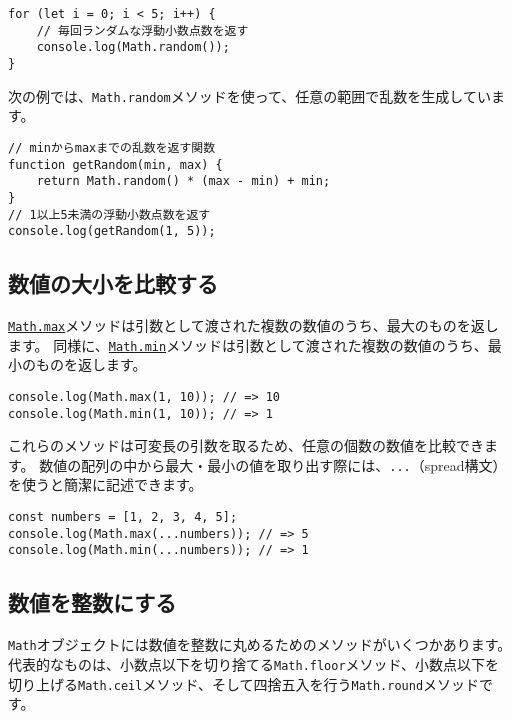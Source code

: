 \begin{lstlisting}
for (let i = 0; i < 5; i++) {
    // 毎回ランダムな浮動小数点数を返す
    console.log(Math.random());
}
\end{lstlisting}

次の例では、\texttt{Math.random}メソッドを使って、任意の範囲で乱数を生成しています。

\begin{lstlisting}
// minからmaxまでの乱数を返す関数
function getRandom(min, max) {
    return Math.random() * (max - min) + min;
}
// 1以上5未満の浮動小数点数を返す
console.log(getRandom(1, 5));
\end{lstlisting}

\hypertarget{compare-number}{%
\subsection{数値の大小を比較する}\label{compare-number}}

\href{https://developer.mozilla.org/ja/docs/Web/JavaScript/Reference/Global_Objects/Math/max}{\texttt{Math.max}}メソッドは引数として渡された複数の数値のうち、最大のものを返します。
同様に、\href{https://developer.mozilla.org/ja/docs/Web/JavaScript/Reference/Global_Objects/Math/min}{\texttt{Math.min}}メソッドは引数として渡された複数の数値のうち、最小のものを返します。

\begin{lstlisting}
console.log(Math.max(1, 10)); // => 10
console.log(Math.min(1, 10)); // => 1
\end{lstlisting}

これらのメソッドは可変長の引数を取るため、任意の個数の数値を比較できます。
数値の配列の中から最大・最小の値を取り出す際には、\texttt{...}（spread構文）を使うと簡潔に記述できます。

\begin{lstlisting}
const numbers = [1, 2, 3, 4, 5];
console.log(Math.max(...numbers)); // => 5
console.log(Math.min(...numbers)); // => 1
\end{lstlisting}

\hypertarget{convert-to-integer}{%
\subsection{数値を整数にする}\label{convert-to-integer}}

\texttt{Math}オブジェクトには数値を整数に丸めるためのメソッドがいくつかあります。
代表的なものは、小数点以下を切り捨てる\texttt{Math.floor}メソッド、小数点以下を切り上げる\texttt{Math.ceil}メソッド、そして四捨五入を行う\texttt{Math.round}メソッドです。

